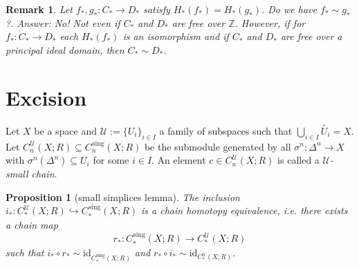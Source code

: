 \documentclass[11pt]{book}
\numberwithin{dummy}{section}
\newtheorem{proposition}[theorem]{Proposition}
\newtheorem{remark}[theorem]{Remark}
\theoremstyle{nonumberbreak}
\newcommand{\la}{\longrightarrow}
\newcommand{\id}{\mathrm{id}}
\newcommand{\Cs}{C^{\hspace{1pt}\mathrm{sing}}}
\begin{document}
\begin{spacing}{1.4}
\begin{remark}
Let $f_*, g_*: C_* \la D_*$ satisfy $H_*(f_*) = H_*(g_*)$. Do we have $f_* \sim g_*$?. Answer: No! Not even if $C_*$ and $D_*$ are free over $\mathbb{Z}$. However, if for $f_*:C_* \la D_*$ each $H_*(f_*)$ is an isomorphism and if $C_*$ and $D_*$ are free over a principal ideal domain, then $C_* \sim D_*$.

\end{remark}

















\section{Excision} %




Let $X$ be a space and $\mathcal{U}:= \{U_i\}_{i\in I}$ a family of subspaces such that $\bigcup_{i\in I} \overset{\circ}{U}_i =X$. Let $C_n^{\mathcal{U}}(X;R) \subseteq \Cs_n(X;R)$ be the submodule generated by all $\sigma^n: \Delta^n\la X$ with $\sigma^n(\Delta^n) \subseteq U_i$ for some $i \in I$. An element $c \in C^{\mathcal{U}}_n(X;R)$ is called a $\mathcal{U}$\textit{-small chain}.

\begin{proposition}[small simplices lemma]
The inclusion $i_*: C_*^{\mathcal{U}}(X;R) \hookrightarrow \Cs_*(X;R)$ is a \textit{chain homotopy equivalence}, i.e. there exists a chain map
$$r_*: \Cs_*(X;R) \la C_*^{\mathcal{U}}(X;R)$$
such that $i_* \circ r_* \sim \id_{\Cs_*(X;R)}$ and $r_* \circ i_* \sim \id_{C_*^{\mathcal{U}}(X;R)}$.
\end{proposition}


\end{spacing}
\end{document}
